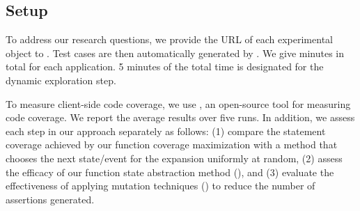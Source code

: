 \subsection{Setup} \label{Sec:setup}
To address our research questions, we provide the URL of each  experimental object to \tool.
Test cases are then automatically generated by \tool.
We give  minutes in total for each application. 
5 minutes of the total time is designated for the dynamic exploration step.

%
 \label{test-gen-setup}
To measure client-side code coverage, we use \jscover \cite{jscover}, an open-source tool for measuring \javascript code coverage. We report the average results over five runs.
In addition,  we assess each step in our approach separately as follows: 
(1) compare the statement coverage achieved by our function coverage maximization with a method that chooses the next state/event for the expansion uniformly at random, 
(2) assess the efficacy of our function state abstraction method (), and 
(3) evaluate the effectiveness of applying mutation techniques () to reduce the number of assertions generated.

